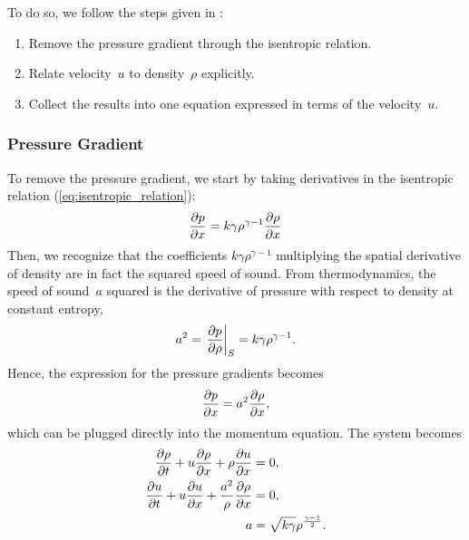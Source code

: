 \documentclass[../../thesis.tex]{subfiles}
\begin{document}
To do so, we follow the steps given in \cite{nonlinearDiffusiveWaves}:
\begin{enumerate}
    \item Remove the pressure gradient through the isentropic relation. 
    \item Relate velocity~$u$ to density~$\rho$ explicitly. %
    \item Collect the results into one equation expressed in terms of the velocity~$u$.
\end{enumerate}

\subsubsection*{Pressure Gradient}
To remove the pressure gradient, we start by taking derivatives in the isentropic relation (\ref{eq:isentropic_relation}):
\begin{equation}
    \pdv{p}{x} = k \gamma \rho^{\gamma-1} \pdv{\rho}{x}
\end{equation}
Then, we recognize that the coefficients $k \gamma \rho^{\gamma-1}$ multiplying the spatial derivative of density are in fact the squared speed of sound.
From thermodynamics, the speed of sound~$a$ squared is the derivative of pressure with respect to density at constant entropy,
\begin{equation}
    a^2 = \left.\pdv{p}{\rho}\right|_S = k \gamma \rho^{\gamma-1}.
\end{equation}
Hence, the expression for the pressure gradients becomes
\begin{equation}
    \pdv{p}{x} = a^2 \pdv{\rho}{x},
\end{equation}
which can be plugged directly into the momentum equation. 
The system becomes
\begin{subequations}
\begin{align}
        \pdv{\rho}{t} + u \pdv{\rho}{x} + \rho \pdv{u}{x} &= 0, \\ 
        \pdv{u}{t} + u \pdv{u}{x} + \frac{a^2}{\rho}\pdv{\rho}{x} &= 0, \\
        a &= \sqrt{k \gamma} \rho^{\frac{\gamma-1}{2}}. 
\end{align}
\end{subequations}
\end{document}
